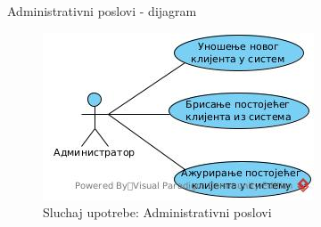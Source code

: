 \documentclass[11pt]{beamer}
\begin{document}
\begin{frame}{Administrativni poslovi - dijagram}
\begin{figure}
    \centering
    \includegraphics[scale=0.8]{Slike/UML/SUadministrativniPoslovi.jpg}
    \caption{Sluchaj upotrebe: Administrativni poslovi}
    \label{fig:ap}
\end{figure}
\end{frame}
\end{document}
